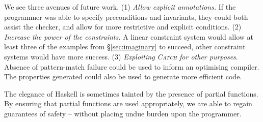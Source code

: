 \documentclass[preprint]{sigplanconf}
\newcommand{\catch}{\textsc{Catch}}
\newcommand{\anon}[2]{#2}
\newenvironment{discuss}
    {\noindent\hspace{-1.5mm}\vline\hspace{1mm}\vline\hspace{1mm}\begin{minipage}[h]{\linewidth}}
    {\end{minipage}}
\begin{document}
We see three avenues of future work. (1) \textit{Allow explicit annotations.} If the programmer was able to specify preconditions and invariants, they could both assist the checker, and allow for more restrictive and explicit conditions. (2) \textit{Increase the power of the constraints.} A linear constraint system would allow at least three of the examples from \S\ref{sec:imaginary} to succeed, other constraint systems would have more success. (3) \textit{Exploiting \catch{} for other purposes}. Absence of pattern-match failure could be used to inform an optimising compiler. The properties generated could also be used to generate more efficient code.

\begin{discuss}
The elegance of Haskell is sometimes tainted by the presence of partial functions. By ensuring that partial functions are used appropriately, we are able to regain guarantees of safety -- without placing undue burden upon the programmer.
\end{discuss}

\anon{\acks The first author is an EPSRC-supported PhD student.}{}



\small

\end{document}
